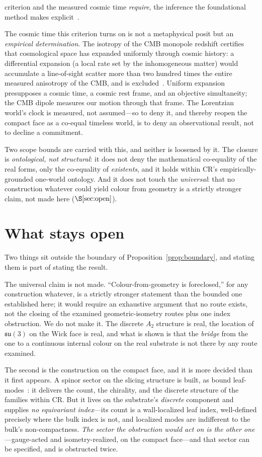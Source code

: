 \documentclass[11pt]{article}
\theoremstyle{plain}
\theoremstyle{remark}
\newcommand{\su}{\mathfrak{su}}
\begin{document}
criterion and the measured cosmic time \emph{require}, the inference the foundational method makes explicit~\cite{JanzenShadowExistence}.

The cosmic time this criterion turns on is not a metaphysical posit but an \emph{empirical determination}. The isotropy of the CMB monopole redshift certifies that cosmological space has expanded uniformly through cosmic history: a differential expansion (a local rate set by the inhomogeneous matter) would accumulate a line-of-sight scatter more than two hundred times the entire measured anisotropy of the CMB, and is excluded~\cite{JanzenModernParallax}. Uniform expansion presupposes a cosmic time, a cosmic rest frame, and an objective simultaneity; the CMB dipole measures our motion through that frame. The Lorentzian world's clock is measured, not assumed---so to deny it, and thereby reopen the compact face as a co-equal timeless world, is to deny an observational result, not to decline a commitment.

Two scope bounds are carried with this, and neither is loosened by it. The closure is \emph{ontological, not structural}: it does not deny the mathematical co-equality of the real forms, only the co-equality of \emph{existents}, and it holds within CR's empirically-grounded one-world ontology. And it does not touch the \emph{universal}: that no construction whatever could yield colour from geometry is a strictly stronger claim, not made here ($\S\ref{sec:open}$).

\section{What stays open}\label{sec:open}

Two things sit outside the boundary of Proposition~\ref{prop:boundary}, and stating them is part of stating the result.

The universal claim is not made. ``Colour-from-geometry is foreclosed,'' for any construction whatever, is a strictly stronger statement than the bounded one established here; it would require an exhaustive argument that no route exists, not the closing of the examined geometric-isometry routes plus one index obstruction. We do not make it. The discrete $A_2$ structure is real, the location of $\su(3)$ on the Wick face is real, and what is shown is that the \emph{bridge} from the one to a continuous internal colour on the real substrate is not there by any route examined.

The second is the construction on the compact face, and it is more decided than it first appears. A spinor sector on the slicing structure is built, as bound leaf-modes~\cite{JanzenMatter}: it delivers the count, the chirality, and the discrete structure of the families within CR. But it lives on the substrate's \emph{discrete} component and supplies \emph{no equivariant index}---its count is a wall-localized leaf index, well-defined precisely where the bulk index is not, and localized modes are indifferent to the bulk's non-compactness. \emph{The sector the obstruction would act on is the other one}---gauge-acted and isometry-realized, on the compact face---and that sector can be specified, and is obstructed twice.
\end{document}

